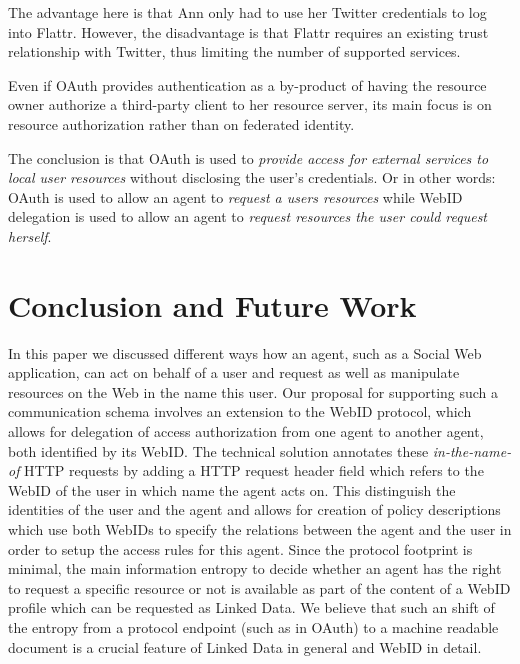 \documentclass[a4paper]{llncs}
\begin{document}
The advantage here is that Ann only had to use her Twitter credentials to log into Flattr.
However, the disadvantage is that Flattr requires an existing trust relationship with Twitter, thus limiting the number of supported services.

Even if OAuth provides authentication as a by-product of having the resource owner authorize a third-party client to her resource server, its main focus is on resource authorization rather than on federated identity.

The conclusion is that OAuth is used to \textit{provide access for external services to local user resources} without disclosing the user's credentials.
Or in other words: OAuth is used to allow an agent to \textit{request a users resources} while WebID delegation is used to allow an agent to \textit{request resources the user could request herself}.



\section{Conclusion and Future Work}\label{sec:conclusion}

In this paper we discussed different ways how an agent, such as a Social Web application, can act on behalf of a user and request as well as manipulate resources on the Web in the name this user.
Our proposal for supporting such a communication schema involves an extension to the WebID protocol, which allows for delegation of access authorization from one agent to another agent, both identified by its WebID.
The technical solution annotates these \textit{in-the-name-of} HTTP requests by adding a HTTP request header field which refers to the WebID of the user in which name the agent acts on.
This distinguish the identities of the user and the agent and allows for creation of policy descriptions which use both WebIDs to specify the relations between the agent and the user in order to setup the access rules for this agent.
Since the protocol footprint is minimal, the main information entropy to decide whether an agent has the right to request a specific resource or not is available as part of the content of a WebID profile which can be requested as Linked Data.
We believe that such an shift of the entropy from a protocol endpoint (such as in OAuth) to a machine readable document is a crucial feature of Linked Data in general and WebID in detail.
\end{document}
